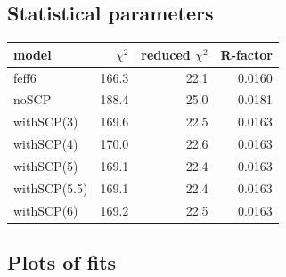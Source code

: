 \documentclass[11pt]{article}
\begin{document}
\subsection{Statistical parameters}
\label{sec:orgheadline21}

\begin{center}
  \begin{tabular}{lrrr}
    model & $\chi^2$ & reduced $\chi^2$ & R-factor\\
    \hline
    feff6        & 166.3 & 22.1 & 0.0160\\
    noSCP        & 188.4 & 25.0 & 0.0181\\
    withSCP(3)   & 169.6 & 22.5 & 0.0163\\
    withSCP(4)   & 170.0 & 22.6 & 0.0163\\
    withSCP(5)   & 169.1 & 22.4 & 0.0163\\
    withSCP(5.5) & 169.1 & 22.4 & 0.0163\\
    withSCP(6)   & 169.2 & 22.5 & 0.0163\\
  \end{tabular}
\end{center}





\subsection{Plots of fits}
\label{sec:orgheadline23}
\end{document}
